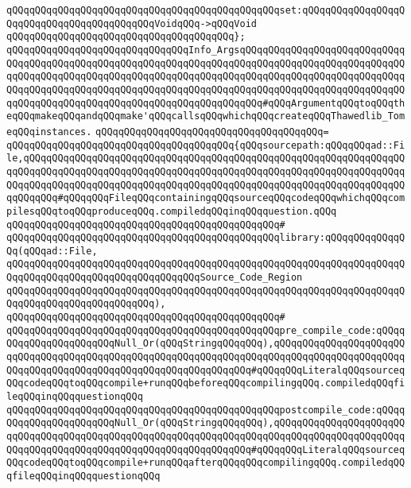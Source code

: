 \verb|qQQqqQQqqQQqqQQqqQQqqQQqqQQqqQQqqQQqqQQqqQQqqQQqset:qQQqqQQqqQQqqQQqqQQqqQQqqQQqqQQqqQQqqQQqqQQqVoidqQQq->qQQqVoid|\newline
\verb|qQQqqQQqqQQqqQQqqQQqqQQqqQQqqQQqqQQqqQQq};|\newline
\newline
\verb|qQQqqQQqqQQqqQQqqQQqqQQqqQQqqQQqInfo_ArgsqQQqqQQqqQQqqQQqqQQqqQQqqQQqqQQqqQQqqQQqqQQqqQQqqQQqqQQqqQQqqQQqqQQqqQQqqQQqqQQqqQQqqQQqqQQqqQQqqQQqqQQqqQQqqQQqqQQqqQQqqQQqqQQqqQQqqQQqqQQqqQQqqQQqqQQqqQQqqQQqqQQqqQQqqQQqqQQqqQQqqQQqqQQqqQQqqQQqqQQqqQQqqQQqqQQqqQQqqQQqqQQqqQQqqQQqqQQqqQQqqQQqqQQqqQQqqQQqqQQqqQQqqQQqqQQqqQQqqQQqqQQq#qQQqArgumentqQQqtoqQQqtheqQQqmakeqQQqandqQQqmake'qQQqcallsqQQqwhichqQQqcreateqQQqThawedlib_TomeqQQqinstances.|\newline
\verb|qQQqqQQqqQQqqQQqqQQqqQQqqQQqqQQqqQQqqQQq=|\newline
\verb|qQQqqQQqqQQqqQQqqQQqqQQqqQQqqQQqqQQqqQQq{qQQqsourcepath:qQQqqQQqad::File,qQQqqQQqqQQqqQQqqQQqqQQqqQQqqQQqqQQqqQQqqQQqqQQqqQQqqQQqqQQqqQQqqQQqqQQqqQQqqQQqqQQqqQQqqQQqqQQqqQQqqQQqqQQqqQQqqQQqqQQqqQQqqQQqqQQqqQQqqQQqqQQqqQQqqQQqqQQqqQQqqQQqqQQqqQQqqQQqqQQqqQQqqQQqqQQqqQQqqQQqqQQqqQQqqQQqqQQq#qQQqqQQqFileqQQqcontainingqQQqsourceqQQqcodeqQQqwhichqQQqcompilesqQQqtoqQQqproduceqQQq.compiledqQQqinqQQqquestion.qQQq|\newline
\verb|qQQqqQQqqQQqqQQqqQQqqQQqqQQqqQQqqQQqqQQqqQQqqQQq#|\newline
\verb|qQQqqQQqqQQqqQQqqQQqqQQqqQQqqQQqqQQqqQQqqQQqqQQqlibrary:qQQqqQQqqQQqqQQq(qQQqad::File,|\newline
\verb|qQQqqQQqqQQqqQQqqQQqqQQqqQQqqQQqqQQqqQQqqQQqqQQqqQQqqQQqqQQqqQQqqQQqqQQqqQQqqQQqqQQqqQQqqQQqqQQqqQQqqQQqSource_Code_Region|\newline
\verb|qQQqqQQqqQQqqQQqqQQqqQQqqQQqqQQqqQQqqQQqqQQqqQQqqQQqqQQqqQQqqQQqqQQqqQQqqQQqqQQqqQQqqQQqqQQqqQQq),|\newline
\verb|qQQqqQQqqQQqqQQqqQQqqQQqqQQqqQQqqQQqqQQqqQQqqQQq#|\newline
\verb|qQQqqQQqqQQqqQQqqQQqqQQqqQQqqQQqqQQqqQQqqQQqqQQqpre_compile_code:qQQqqQQqqQQqqQQqqQQqqQQqNull_Or(qQQqStringqQQqqQQq),qQQqqQQqqQQqqQQqqQQqqQQqqQQqqQQqqQQqqQQqqQQqqQQqqQQqqQQqqQQqqQQqqQQqqQQqqQQqqQQqqQQqqQQqqQQqqQQqqQQqqQQqqQQqqQQqqQQqqQQqqQQqqQQqqQQqqQQq#qQQqqQQqLiteralqQQqsourceqQQqcodeqQQqtoqQQqcompile+runqQQqbeforeqQQqcompilingqQQq.compiledqQQqfileqQQqinqQQqquestionqQQq|\newline
\verb|qQQqqQQqqQQqqQQqqQQqqQQqqQQqqQQqqQQqqQQqqQQqqQQqpostcompile_code:qQQqqQQqqQQqqQQqqQQqqQQqNull_Or(qQQqStringqQQqqQQq),qQQqqQQqqQQqqQQqqQQqqQQqqQQqqQQqqQQqqQQqqQQqqQQqqQQqqQQqqQQqqQQqqQQqqQQqqQQqqQQqqQQqqQQqqQQqqQQqqQQqqQQqqQQqqQQqqQQqqQQqqQQqqQQqqQQqqQQq#qQQqqQQqLiteralqQQqsourceqQQqcodeqQQqtoqQQqcompile+runqQQqafterqQQqqQQqcompilingqQQq.compiledqQQqfileqQQqinqQQqquestionqQQq|\newline
